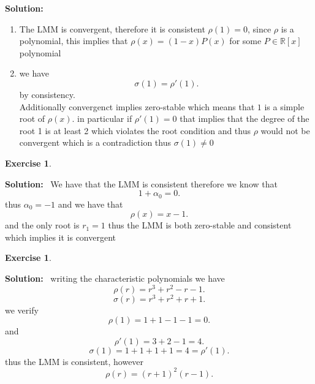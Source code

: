 \documentclass[a4paper,12pt]{scrartcl} %
\newenvironment{solution}
  {\par\color{answercolor}\textbf{Solution:}\ }
  {\par}
\newcounter{customcounter}
\theoremstyle{darktheorem}
\newtheorem{exercise}[customcounter]{Exercise}
\begin{document}
\begin{solution}
    \begin{enumerate}
        \item The LMM is convergent, therefore it is consistent  $\rho(1) = 0$, since $\rho $ is a polynomial,
            this implies that $\rho(x) = (1-x)P(x)$ for some $P \in \mathbb{R}[x]$ polynomial
        \item 
            we have
            \[
            \sigma(1) = \rho'(1)
            .\] 
            by consistency.\\
            Additionally convergenct implies zero-stable  which means that $1$ is a simple root  of $\rho(x)$.
            in particular if $\rho'(1) = 0$ that implies that the degree of the root 1 is at least 2 which  violates
            the root condition and thus $\rho $ would not be convergent which is a contradiction thus $\sigma(1) \ne 0$
   \end{enumerate}
\end{solution}
\begin{exercise}
        
\end{exercise}
\begin{solution}
    We have that the LMM is consistent therefore we know that
    \[
    1 + \alpha_0 =0
    .\] 
    thus $\alpha_0 = -1$ and we have that
    \[
    \rho(x) = x -1
    .\] 
    and the only root is $r_1=1$ thus the LMM is both zero-stable and consistent which implies it is convergent
\end{solution}


\begin{exercise}
        
\end{exercise}
\begin{solution}
    writing the characteristic polynomials we have
    \[
    \rho(r) = r^3 + r^2 - r - 1
    .\] 
    \[
    \sigma(r) = r^{3} + r^2 + r + 1
    .\] 
    we verify
    \[
    \rho(1) = 1 + 1 - 1 -1 = 0
    .\] 
    and
    \[
    \rho'(1) = 3 + 2 - 1 = 4
    .\] 
    \[
    \sigma(1) = 1 + 1 + 1 + 1 = 4 = \rho'(1)
    .\] 
    thus the LMM is consistent, however
    \[
    \rho(r) = (r+1)^2(r-1)
    .\] 
\end{solution}
\end{document}
